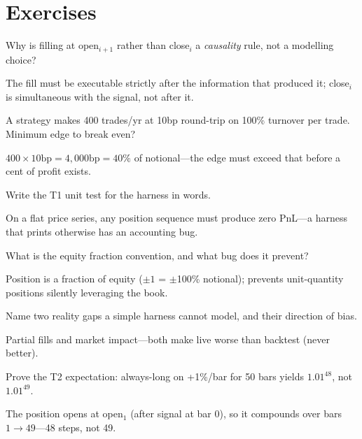 \section{Exercises}
\begin{exercise}[easy]
Why is filling at open$_{i+1}$ rather than close$_i$ a \emph{causality} rule, not a
modelling choice?
\end{exercise}
\begin{solution}
The fill must be executable strictly after the information that produced it; close$_i$ is
simultaneous with the signal, not after it.
\end{solution}

\begin{exercise}[easy]
A strategy makes 400 trades/yr at 10bp round-trip on 100\% turnover per trade. Minimum edge
to break even?
\end{exercise}
\begin{solution}
$400\times10\mathrm{bp}=4{,}000\mathrm{bp}=40\%$ of notional---the edge must exceed that
before a cent of profit exists.
\end{solution}

\begin{exercise}[easy]
Write the T1 unit test for the harness in words.
\end{exercise}
\begin{solution}
On a flat price series, any position sequence must produce zero PnL---a harness that prints
otherwise has an accounting bug.
\end{solution}

\begin{exercise}[easy]
What is the equity fraction convention, and what bug does it prevent?
\end{exercise}
\begin{solution}
Position is a fraction of equity ($\pm1$ = $\pm$100\% notional); prevents unit-quantity
positions silently leveraging the book.
\end{solution}

\begin{exercise}[easy]
Name two reality gaps a simple harness cannot model, and their direction of bias.
\end{exercise}
\begin{solution}
Partial fills and market impact---both make live worse than backtest (never better).
\end{solution}

\begin{exercise}
Prove the T2 expectation: always-long on +1\%/bar for 50 bars yields $1.01^{48}$, not
$1.01^{49}$.
\end{exercise}
\begin{solution}
The position opens at open$_1$ (after signal at bar 0), so it compounds over bars
$1\to49$---48 steps, not 49.
\end{solution}

